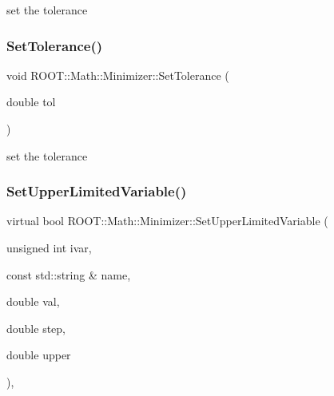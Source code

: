 set the tolerance 

\mbox{\label{classROOT_1_1Math_1_1Minimizer_a5b7ee47a24b2412801654b8cde2c9b4f}} 
\subsubsection{\texorpdfstring{SetTolerance()}{SetTolerance()}\hspace{0.1cm}{\footnotesize\ttfamily [2/2]}}
{\footnotesize\ttfamily void R\+O\+O\+T\+::\+Math\+::\+Minimizer\+::\+Set\+Tolerance (\begin{DoxyParamCaption}\item[{double}]{tol }\end{DoxyParamCaption})\hspace{0.3cm}{\ttfamily [inline]}}



set the tolerance 

\mbox{\label{classROOT_1_1Math_1_1Minimizer_a804843fbaea82809b3c54232d0c1fe86}} 
\subsubsection{\texorpdfstring{SetUpperLimitedVariable()}{SetUpperLimitedVariable()}\hspace{0.1cm}{\footnotesize\ttfamily [1/2]}}
{\footnotesize\ttfamily virtual bool R\+O\+O\+T\+::\+Math\+::\+Minimizer\+::\+Set\+Upper\+Limited\+Variable (\begin{DoxyParamCaption}\item[{unsigned int}]{ivar,  }\item[{const std\+::string \&}]{name,  }\item[{double}]{val,  }\item[{double}]{step,  }\item[{double}]{upper }\end{DoxyParamCaption})\hspace{0.3cm}{\ttfamily [inline]}, {\ttfamily [virtual]}}



